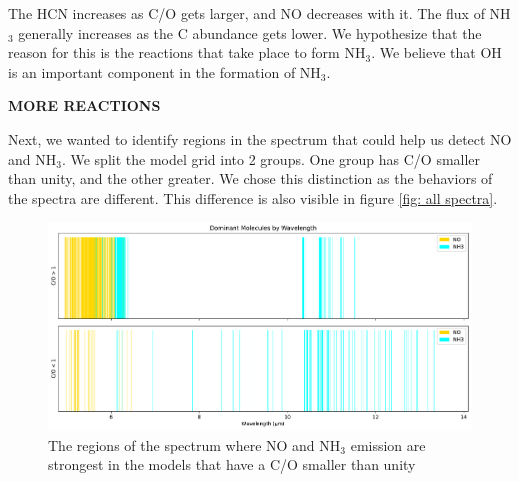 \documentclass[oneside, single, authoryear, semicolon]{lion-msc}
\newcommand{\4}{$_4$}
\newcommand{\3}{$_3$}
\newcommand{\2}{$_2$}
\begin{document}
The HCN increases as C/O gets larger, and NO decreases with it. The flux of NH\3 generally increases as the C abundance gets lower. We hypothesize that the reason for this is the reactions that take place to form NH\3.
We believe that OH is an important component in the formation of NH\3.


\textbf{MORE REACTIONS}

Next, we wanted to identify regions in the spectrum that could help us detect NO and NH\3. We split the model grid into 2 groups. One group has C/O smaller than unity, and the other greater. We chose this distinction as the behaviors of the spectra are different. This difference is also visible in figure \ref{fig: all spectra}. 



\begin{figure}[!ht]
    \centering
    \includegraphics[width=\linewidth]{Figures/ClassificationCO.pdf}
    \caption{The regions of the spectrum where NO and NH\3 emission are strongest in the models that have a C/O smaller than unity}
    \label{fig: class<1}
\end{figure}
\end{document}
